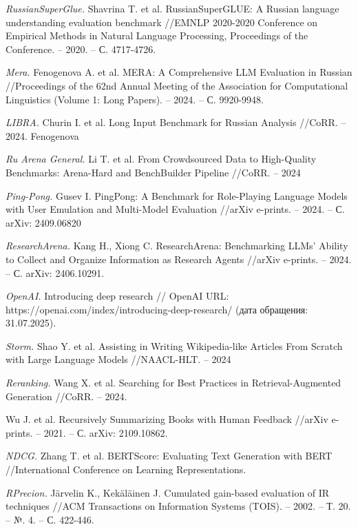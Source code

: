 \documentclass{article}
\begin{document}
\begin{thebibliography}{99}

\textit{RussianSuperGlue.}
Shavrina T. et al. RussianSuperGLUE: A Russian language understanding evaluation benchmark //EMNLP 2020-2020 Conference on Empirical Methods in Natural Language Processing, Proceedings of the Conference. – 2020. – С. 4717-4726.

\textit{Mera.}
Fenogenova A. et al. MERA: A Comprehensive LLM Evaluation in Russian //Proceedings of the 62nd Annual Meeting of the Association for Computational Linguistics (Volume 1: Long Papers). – 2024. – С. 9920-9948.

\textit{LIBRA.}
Churin I. et al. Long Input Benchmark for Russian Analysis //CoRR. – 2024. Fenogenova 

\textit{Ru Arena General.}
Li T. et al. From Crowdsourced Data to High-Quality Benchmarks: Arena-Hard and BenchBuilder Pipeline //CoRR. – 2024

\textit{Ping-Pong.}
Gusev I. PingPong: A Benchmark for Role-Playing Language Models with User Emulation and Multi-Model Evaluation //arXiv e-prints. – 2024. – С. arXiv: 2409.06820

\textit{ResearchArena.}
Kang H., Xiong C. ResearchArena: Benchmarking LLMs' Ability to Collect and Organize Information as Research Agents //arXiv e-prints. – 2024. – С. arXiv: 2406.10291.

\textit{OpenAI.}
Introducing deep research // OpenAI URL: https://openai.com/index/introducing-deep-research/ (дата обращения: 31.07.2025).

\textit{Storm.}
Shao Y. et al. Assisting in Writing Wikipedia-like Articles From Scratch with Large Language Models //NAACL-HLT. – 2024

\textit{Reranking.}
Wang X. et al. Searching for Best Practices in Retrieval-Augmented Generation //CoRR. – 2024.

Wu J. et al. Recursively Summarizing Books with Human Feedback //arXiv e-prints. – 2021. – С. arXiv: 2109.10862.

\textit{NDCG.}
Zhang T. et al. BERTScore: Evaluating Text Generation with BERT //International Conference on Learning Representations.

\textit{RPrecion.}
Järvelin K., Kekäläinen J. Cumulated gain-based evaluation of IR techniques //ACM Transactions on Information Systems (TOIS). – 2002. – Т. 20. – №. 4. – С. 422-446.


\end{thebibliography}
\end{document}
